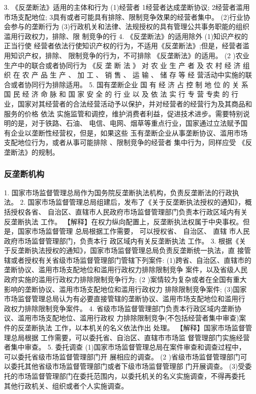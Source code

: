 \documentclass[UTF8,12pt]{ctexart}
\numberwithin{equation}{section} %
\numberwithin{figure}{section}
\numberwithin{table}{section}
\begin{document}
	3. 《反垄断法》适用的主体和行为
	(1)经营者
	1经营者达成垄断协议;
	2经营者滥用市场支配地位;
	3具有或者可能具有排除、限制竞争效果的经营者集中。
	(2)行业协会参与的垄断行为
	(3)行政机关和法律、法规授权的具有管理公共事务职能的组织滥用行政权力，排除、限
	制竞争的行
	4. 《反垄断法》的适用除外
	(1)知识产权的正当行使
	经营者依法行使知识产权的行为，不适用《反垄断法》;但是，经营者滥用知识产权，排除、
	限制竞争的行为，不可排除 《反垄断法》的适用。
	(2 )农业生产中的联合或者协同行为
	《反 垄 断 法 》 对 农 业 生 产 者 及 农 村 经 济 组 织 在 农 产 品 生 产 、 加 工 、 销 售 、 运 输 、 储 存 等 经
	营活动中实施的联合或者协同行为排除适用。
	5. 国有垄断企业
	国 有 经 济 占 控 制 地 位 的 关 系 国 民 经 济 命 脉 和 国 家 安 全 的 行 业 以 及 依 法 实 行 专 营 专卖 的 行
	业，国家对其经营者的合法经营活动予以保护，并对经营者的经营行为及其商品和服务的价格
	依法 实施监管和调控，维护消费者利益，促进技术进步。需要特别说明的是，对于铁路、石油、
	电信、电网、烟草等重点行业，国家通过立法赋予国有企业以垄断性经营权，但是，如果这些
	玉有垄断企业从事垄断协议、滥用市场支配地位行为，或者从事可能排除 、限制竞争的经营者
	集中行为，同样应受 《反垄断法》的规制。
	
	
	\subsubsection{反垄断机构}
	1. 国家市场监督管理总局作为国务院反垄断执法机构，负责反垄断法的行政执法。
	2. 国家市场监督管理总局组建后，发布了《关于反垄断执法授权的通知》，概括授权各省、
	自治区、直辖市人民政府市场监督管理部门负责本行政区域内有关反垄断执法 工作。
	【解释】在权力纵向配置上，反垄断执法权属于中央事权。但是，国家市场监督管理
	总局根据工作需要， 可以授权省、 自治区、 直辖 市人民政府市场监督管理部门，负责本行
	政区域内有关反垄断执法 工作。
	3. 根据《关于反垄断执法授权的通知》，国家市场监督管理总局负责反垄断统一执法，直
	接管辖或者授权有关省级市场监督管理部门管辖下列案件:
	(1)跨省、自治区、直辖市的垄断协议、滥用市场支配地位和滥用行政权力排除限制竞争
	案件，以及省级人民政府实施的滥用行政权力排除限制竞争行为;
	(2 )案情较为复杂或者在全国有重大影响的垄断协议、滥用市场支配地位和滥用行政权力
	排除限制竞争案件;
	(3)国家市场监督管理总局认为有必要直接管辖的垄断协议、滥用市场支配地位和滥用行
	政权力排除限制竞争案件。
	4. 省级市场监督管理部门负责本行政区域内垄断协议、滥用市场支配地位、滥用行政权
	力排除限制竞争(不包括经营者集中审查)案件的反垄断执法 工作，以本机关的名义依法作出
	处理。
	【解释】国家市场监督管理总局根据 工作需要，可以委托省、自治区、直辖市市场监
	督管理部门实施经营者集中审查。
	5. 委托调查
	(1)国家市场监督管理总局在案件审查和调查过程中，可以委托省级市场监督管理部门开
	展相应的调查。
	(2 )省级市场监督管理部门可以委托其他省级市场监督管理部门或者下级市场监督管理部
	门开展调查。
	(3)受委托的市场监督管理部门在委托范围内，以委托机关的名义实施调查，不得再委托
	其他行政机关、组织或者个人实施调查。
	
\end{document}
